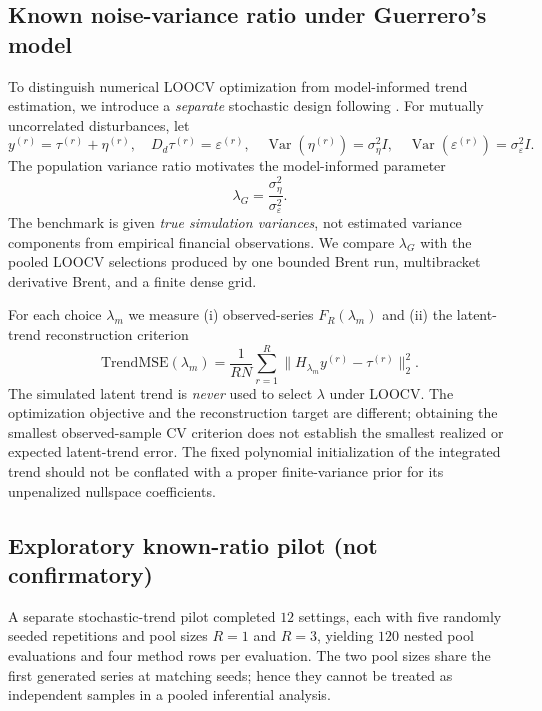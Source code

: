 \documentclass[11pt]{article}
\begin{document}
\subsection{Known noise-variance ratio under Guerrero's model}

To distinguish numerical LOOCV optimization from model-informed trend
estimation, we introduce a \emph{separate} stochastic design following
\citet{guerrero2007}. For mutually uncorrelated disturbances, let
\begin{equation}
 y^{(r)}=\tau^{(r)}+\eta^{(r)},\quad
 D_d\tau^{(r)}=\varepsilon^{(r)},\quad
 \operatorname{Var}(\eta^{(r)})=\sigma_\eta^2I,\quad
 \operatorname{Var}(\varepsilon^{(r)})=\sigma_\varepsilon^2I.
\end{equation}
The population variance ratio motivates the model-informed parameter
\begin{equation}
 \lambda_G=\frac{\sigma_\eta^2}{\sigma_\varepsilon^2}.
\end{equation}
The benchmark is given \emph{true simulation variances}, not estimated
variance components from empirical financial observations. We compare
$\lambda_G$ with the pooled LOOCV selections produced by one bounded
Brent run, multibracket derivative Brent, and a finite dense grid.

For each choice $\lambda_m$ we measure (i) observed-series
$F_R(\lambda_m)$ and (ii) the latent-trend reconstruction criterion
\begin{equation}
 \mathrm{TrendMSE}(\lambda_m)=
 \frac{1}{RN}\sum_{r=1}^R
 \|H_{\lambda_m}y^{(r)}-\tau^{(r)}\|_2^2.
\end{equation}
The simulated latent trend is \emph{never} used to select $\lambda$
under LOOCV. The optimization objective and the reconstruction target
are different; obtaining the smallest observed-sample CV criterion
does not establish the smallest realized or expected latent-trend
error. The fixed polynomial initialization of the integrated trend
should not be conflated with a proper finite-variance prior for
its unpenalized nullspace coefficients.

\subsection{Exploratory known-ratio pilot (not confirmatory)}
A separate stochastic-trend pilot completed $12$ settings,
each with five randomly seeded repetitions and pool sizes $R=1$
and $R=3$, yielding $120$ nested pool evaluations and four method
rows per evaluation. The two pool sizes share the first generated
series at matching seeds; hence they cannot be treated as
independent samples in a pooled inferential analysis.
\end{document}
